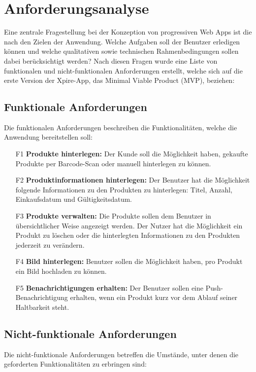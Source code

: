 \section{Anforderungsanalyse}
Eine zentrale Fragestellung bei der Konzeption von progressiven Web Apps ist die nach den Zielen der Anwendung. Welche Aufgaben soll der Benutzer erledigen können und welche qualitativen sowie technischen Rahmenbedingungen sollen dabei berücksichtigt werden? Nach diesen Fragen wurde eine Liste von funktionalen und nicht-funktionalen Anforderungen erstellt, welche sich auf die erste Version der Xpire-App, das Minimal Viable Product (MVP), beziehen:

\subsection{Funktionale Anforderungen}
Die funktionalen Anforderungen beschreiben die Funktionalitäten, welche die Anwendung bereitstellen soll:
\begin{itemize}[noitemsep]
	\item[F1] \textbf{Produkte hinterlegen:} Der Kunde soll die Möglichkeit haben, gekaufte Produkte per Barcode-Scan oder manuell hinterlegen zu können.
	\item[F2] \textbf{Produktinformationen hinterlegen:} Der Benutzer hat die Möglichkeit folgende Informationen zu den Produkten zu hinterlegen: Titel, Anzahl, Einkaufsdatum und Gültigkeitsdatum.
	\item[F3] \textbf{Produkte verwalten:} Die Produkte sollen dem Benutzer in übersichtlicher Weise angezeigt werden. Der Nutzer hat die Möglichkeit ein Produkt zu löschen oder die hinterlegten Informationen zu den Produkten jederzeit zu verändern.
	\item[F4] \textbf{Bild hinterlegen:} Benutzer sollen die Möglichkeit haben, pro Produkt ein Bild hochladen zu können.
	\item[F5] \textbf{Benachrichtigungen erhalten:} Der Benutzer sollen eine Push-Benachrichtigung erhalten, wenn ein Produkt kurz vor dem Ablauf seiner Haltbarkeit steht.
\end{itemize}

\subsection{Nicht-funktionale Anforderungen}
Die nicht-funktionale Anforderungen betreffen die Umstände, unter denen die geforderten Funktionalitäten zu erbringen sind:

